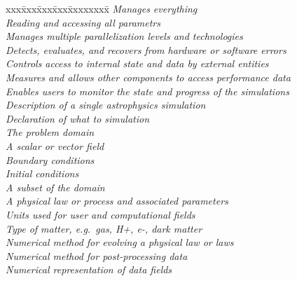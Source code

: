 \begin{tabbing}
xxx\=xxx\=xxx\=xxx\=xxxxxxxx\= \kill
 \>           \>\>\>\> \textit{Manages everything}  \\
 \>\>        \>\>\> \textit{Reading and accessing all parametrs} \\
 \>\>          \>\>\> \textit{Manages multiple parallelization levels and technologies} \\
 \>\>          \>\>\> \textit{Detects, evaluates, and recovers from hardware or software errors} \\
 \>\>            \>\>\> \textit{Controls access to internal state and data by external entities} \\
 \>\>       \>\>\> \textit{Measures and allows other components to access performance data} \\
 \>\>           \>\>\> \textit{Enables users to monitor the state and progress of the simulations} \\
 \>        \>\>\>\> \textit{Description of a single astrophysics simulation} \\
 \>\>           \>\>\> \textit{Declaration of what to simulation} \\
 \>\>\>            \>\> \textit{The problem domain} \\
 \>\>\>             \>\> \textit{A scalar or vector field} \\
 \>\>\>          \>\> \textit{Boundary conditions} \\
 \>\>\>           \>\> \textit{Initial conditions} \\
 \>\>\>\>            \> \textit{A subset of the domain} \\
 \>\>           \>\>\> \textit{A physical law or process and associated parameters} \\
 \>\>\>             \>\> \textit{Units used for user and computational fields} \\
 \>\>\>          \>\> \textit{Type of matter, e.g.~gas, H+, e-, dark matter} \\
 \>\>            \>\>\> \textit{Numerical method for evolving a physical law or laws} \\
 \>\>          \>\>\> \textit{Numerical method for post-processing data} \\
 \>\>              \>\>\> \textit{Numerical representation of data fields} \\

\end{tabbing}
